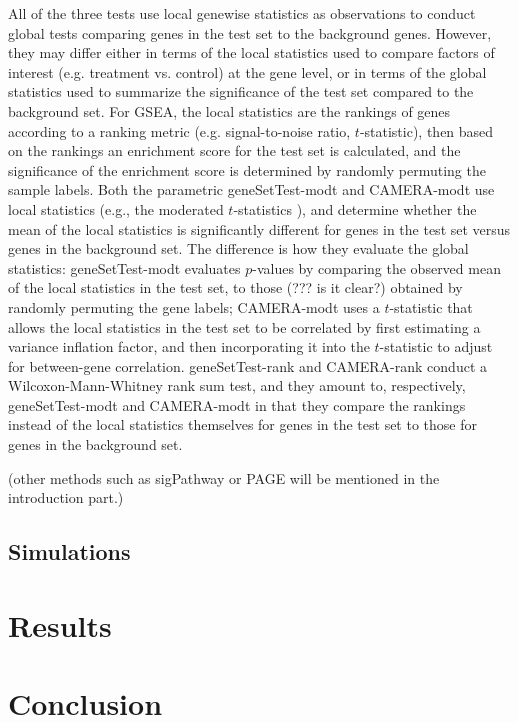 \documentclass[11pt, a4paper]{article}
\begin{document}
	All of the three tests use local genewise statistics as observations to conduct global tests comparing genes in the test set to the background genes. However, they may differ either in terms of the local statistics used to compare factors of interest (e.g. treatment vs. control) at the gene level, or in terms of the global statistics used to summarize the significance of the test set compared to the background set. For GSEA, the local statistics are the rankings of genes according to a ranking metric (e.g. signal-to-noise ratio, $t$-statistic), then based on the rankings an enrichment score for the test set is calculated, and the significance of the enrichment score is determined by randomly permuting the sample labels. Both the parametric geneSetTest-modt and CAMERA-modt use local statistics (e.g., the moderated $t$-statistics \citep{Smyth2004moderated}), and determine whether the mean of the local statistics is significantly different for genes in the test set versus genes in the background set. The difference is how they evaluate the global statistics: geneSetTest-modt evaluates $p$-values by comparing the observed mean of the local statistics in the test set, to those (??? is it clear?) obtained by randomly permuting the gene labels; CAMERA-modt uses a $t$-statistic that allows the local statistics in the test set to be correlated by first estimating a variance inflation factor, and then incorporating it into the $t$-statistic to adjust for between-gene correlation. geneSetTest-rank and CAMERA-rank conduct a Wilcoxon-Mann-Whitney rank sum test, and they amount to, respectively, geneSetTest-modt and CAMERA-modt in that they compare the rankings instead of the local statistics themselves for genes in the test set to those for genes in the background set. 
	
	(other methods such as sigPathway or PAGE will be mentioned in the introduction part.)
	
	\subsection{Simulations}\label{subsection:simulation}
		
	\section{Results}\label{section:results}
	
	\section{Conclusion}\label{section:conclusion}
	
\end{document}
